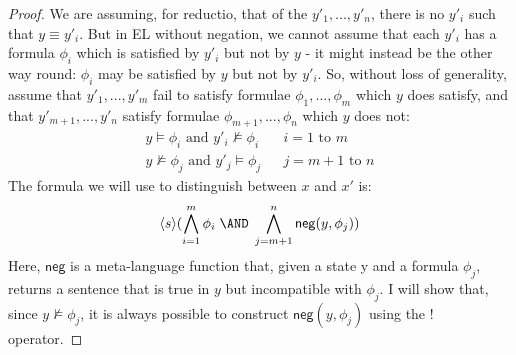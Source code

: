 \begin{proof}
We are assuming, for reductio, that of the $y'_1, ..., y'_n$, there is no $y'_i$ such that $y \equiv y'_i$.
But in EL without negation, we cannot assume that each $y'_i$ has a formula $\phi_i$ which is satisfied by $y'_i$ but not by $y$ - it might instead be the other way round: $\phi_i$ may be satisfied by $y$ but not by $y'_i$. So, without loss of generality, assume that $y'_1, ..., y'_m$ fail to satisfy formulae $\phi_1, ..., \phi_m$ which $y$ does satisfy, and that $y'_{m+1}, ..., y'_n$ satisfy formulae $\phi_{m+1}, ..., \phi_n$ which $y$ does not:
\begin{eqnarray}
y \models \phi_i \mbox{ and } y'_i \nvDash \phi_i & & i = 1 \mbox{ to } m \nonumber \\
y \nvDash \phi_j \mbox{ and } y'_j \models \phi_j & & j = m+1 \mbox{ to } n \nonumber
\end{eqnarray}
The formula we will use to distinguish between $x$ and $x'$ is:
\[
 \langle s \rangle ( \bigwedge_{i=1}^m \phi_i \; \AND \; \bigwedge_{j=m+1}^n \mathsf{neg}(y, \phi_j))
 \]
 Here, $\mathsf{neg}$ is a meta-language function that, given a state y and a formula $\phi_j$, returns a sentence that is true in $y$ but incompatible with $\phi_j$. I will show that, since $y \nvDash \phi_j$, it is always possible to construct $ \mathsf{neg}(y, \phi_j)$ using the $!$ operator.


\end{proof}
